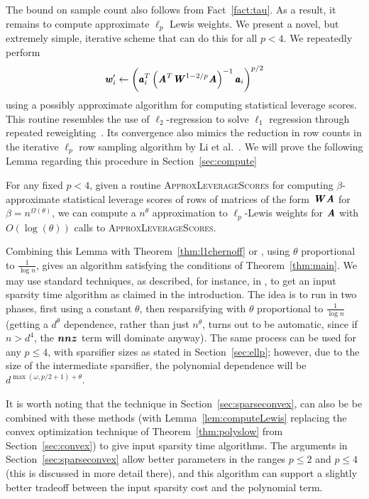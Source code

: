 The bound on sample count also follows from Fact~\ref{fact:tau}.
As a result, it remains to compute approximate $\ell_p$ Lewis weights.
We present a novel, but extremely simple, iterative scheme that can do this for all $p < 4$.
We repeatedly perform
\begin{equation*}
\ww'_i \leftarrow \left( \aa_i^T \left( \AA^T \WW^{1 - 2/p} \AA \right)^{-1} \aa_i \right)^{p/2}
\end{equation*}
using a possibly approximate algorithm for computing statistical leverage scores.
This routine resembles the use of $\ell_2$-regression to solve $\ell_1$
regression through repeated reweighting~\cite{ChinMMP13}.
Its convergence also mimics the reduction in row counts in the iterative $\ell_p$
row sampling algorithm by Li et al.~\cite{LiMP13}.
We will prove the following Lemma regarding this procedure in Section~\ref{sec:compute}
\begin{lemma}
\label{lem:computeLewis}
For any fixed $p < 4$, given a routine \textsc{ApproxLeverageScores} for computing
$\beta$-approximate statistical leverage scores of rows of matrices of the form $\WW \AA$ for
$\beta = n^{\Omega(\theta)}$, we can compute a $n^{\theta}$ approximation to
$\ell_p$-Lewis weights for $\AA$ with $O(\log(\theta))$ calls to \textsc{ApproxLeverageScores}. 
\end{lemma}

Combining this Lemma with Theorem~\ref{thm:l1chernoff} or \cite{Talagrand90}, using $\theta$ proportional
to $\frac{1}{\log n}$, gives an algorithm satisfying the conditions of Theorem~\ref{thm:main}.
We may use standard techniques, as described, for instance, in \cite{CohenLMMPS14:arxiv}, to
get an input sparsity time algorithm as claimed in the introduction.
The idea is to run in two phases, first using a constant $\theta$, then resparsifying with $\theta$
proportional to $\frac{1}{\log n}$ (getting a $d^{\theta}$ dependence, rather than just $n^\theta$,
turns out to be automatic, since if $n > d^4$, the $\nnz$ term will dominate anyway).
The same process can be used for any $p \leq 4$, with sparsifier
sizes as stated in Section~\ref{sec:ellp}; however, due to the size of the intermediate sparsifier,
the polynomial dependence will be $d^{\max(\omega, p/2+1) + \theta}$.

It is worth noting that the technique in Section~\ref{sec:sparseconvex}, can also be be combined with
these methods (with Lemma~\ref{lem:computeLewis} replacing the convex optimization technique of
Theorem~\ref{thm:polyslow} from Section~\ref{sec:convex}) to give input sparsity time algorithms.
The arguments in Section~\ref{sec:sparseconvex} allow better parameters in the ranges $p \leq 2$
and $p \leq 4$ (this is discussed in more detail there), and this algorithm can support a
slightly better tradeoff between the input sparsity cost and the polynomial term.
